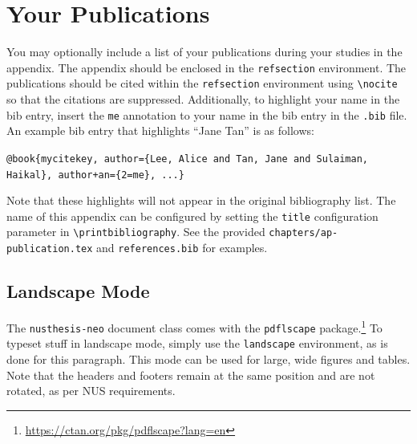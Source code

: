 \section{Your Publications}
You may optionally include a list of your publications during your studies
in the appendix. The appendix should be enclosed in the \texttt{refsection}
environment. The publications should be cited within the \texttt{refsection}
environment using \texttt{\textbackslash nocite} so that the citations are
suppressed. Additionally, to highlight your name in the bib entry,
insert the \texttt{me} annotation to your name in the bib entry in the
\texttt{.bib} file.
An example bib entry that highlights ``Jane Tan'' is as follows:

\texttt{@book\{mycitekey, author=\{Lee, Alice and Tan, Jane and Sulaiman, Haikal\}, author+an=\{2=me\}, ...\}}

Note that these highlights will not appear in the original
bibliography list. The name of this appendix can be configured by setting
the \texttt{title} configuration parameter in \texttt{\textbackslash printbibliography}.
See the provided \texttt{chapters/ap-publication.tex} and \texttt{references.bib}
for examples.

\begin{landscape}
\section{Landscape Mode}
The \texttt{nusthesis-neo} document class comes with the \texttt{pdflscape} package.\footnote{\url{https://ctan.org/pkg/pdflscape?lang=en}} To typeset stuff in landscape mode, simply use the \texttt{landscape} environment, as is done for this paragraph. This mode can be used for large, wide figures and tables. Note that the headers and footers remain at the same position and are not rotated, as per NUS requirements.
\end{landscape}
